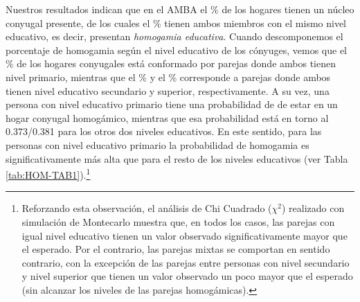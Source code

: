\documentclass[
  spanish,
  a4paper,%
  chapterprefix=true,%
  DIV=calc,%
  twoside]{scrbook}%
\begin{document}
Nuestros resultados indican que en el AMBA el
\% de los hogares
tienen un núcleo conyugal presente, de los cuales el
\% tienen ambos
miembros con el mismo nivel educativo, es decir, presentan \emph{homogamia
educativa}. Cuando descomponemos el porcentaje de homogamia según el
nivel educativo de los cónyuges, vemos que el
\% de los hogares
conyugales está conformado por parejas donde ambos tienen nivel
primario, mientras que el
\% y el
\% corresponde a
parejas donde ambos tienen nivel educativo secundario y superior,
respectivamente. A su vez, una persona con nivel educativo primario
tiene una probabilidad de
 de estar en un
hogar conyugal homogámico, mientras que esa probabilidad está en torno
al
0.373/0.381
para los otros dos niveles educativos. En este sentido, para las
personas con nivel educativo primario la probabilidad de homogamia es
significativamente más alta que para el resto de los niveles educativos
(ver Tabla \ref{tab:HOM-TAB1}).\footnote{Reforzando esta observación, el análisis
  de Chi Cuadrado (\(\chi^2\)) realizado con simulación de Montecarlo
  muestra que, en todos los casos, las parejas con igual nivel
  educativo tienen un valor observado significativamente mayor que el
  esperado. Por el contrario, las parejas mixtas se comportan en
  sentido contrario, con la excepción de las parejas entre personas
  con nivel secundario y nivel superior que tienen un valor observado
  un poco mayor que el esperado (sin alcanzar los niveles de las
  parejas homogámicas).}
\end{document}
